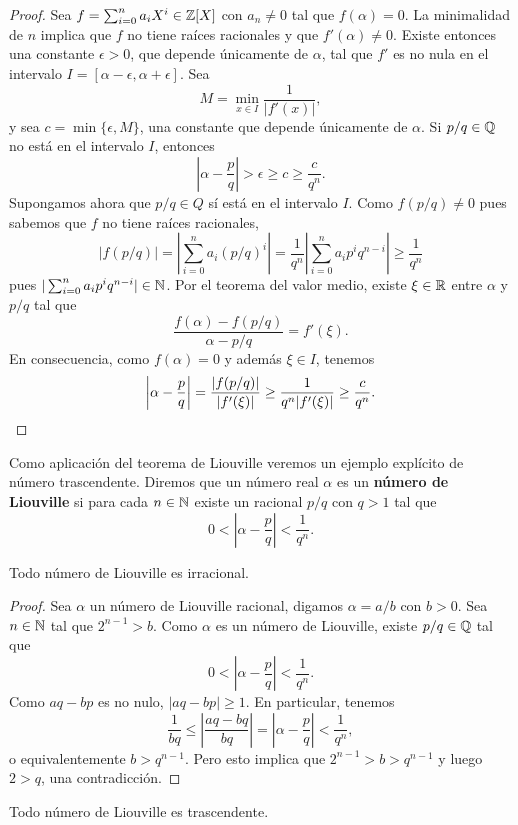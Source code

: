 \begin{proof}
	Sea	$f=\sum_{i=0}^na_iX^i\in\mathbb{Z}[X]$ con $a_n\ne0$ tal que $f(\alpha)=0$.  
	La minimalidad
	de $n$ implica que $f$ no tiene raíces racionales y que $f'(\alpha)\ne 0$.
	Existe entonces una constante $\epsilon>0$, que depende únicamente de
	$\alpha$,  tal que $f'$ es no nula en el intervalo
	$I=[\alpha-\epsilon,\alpha+\epsilon]$.  Sea 
	\[
		M=\min_{x\in I}\frac{1}{|f'(x)|},
	\]
	y sea $c=\min\{\epsilon,M\}$, una constante que depende únicamente de $\alpha$. 
	Si $p/q\in\mathbb{Q}$ no está en el intervalo $I$, entonces 
	\[
		\left|\alpha-\frac{p}{q}\right|>\epsilon\geq c\geq\frac{c}{q^n}.
	\]
	Supongamos ahora que $p/q\in Q$ sí está en el intervalo $I$. Como 
	$f(p/q)\ne 0$ pues sabemos que $f$ no tiene raíces racionales, 
	\[
		|f(p/q)|=\left|\sum_{i=0}^na_i(p/q)^i\right|
		=\frac{1}{q^n}\left|\sum_{i=0}^na_ip^iq^{n-i}\right|\geq\frac{1}{q^n}
	\]
	pues $|\sum_{i=0}^na_ip^iq^{n-i}|\in\mathbb{N}$. Por el teorema del valor medio, existe
	$\xi\in\mathbb{R}$ entre $\alpha$ y $p/q$ tal que 
	\[
		\frac{f(\alpha)-f(p/q)}{\alpha-p/q}=f'(\xi).
	\]
	En consecuencia, como $f(\alpha)=0$ y además $\xi\in I$, tenemos  
	\[
		\left|\alpha-\frac{p}{q}\right|
		=\frac{|f(p/q)|}{|f'(\xi)|}\geq\frac{1}{q^n|f'(\xi)|}\geq\frac{c}{q^n}.\qedhere
	\]
\end{proof}

Como aplicación del teorema de Liouville veremos un ejemplo explícito de número
trascendente.  Diremos que un número real $\alpha$ es un \textbf{número de
Liouville} si para cada $n\in\mathbb{N}$ existe un racional $p/q$ con $q>1$ tal que 
\[
	0<\left|\alpha-\frac{p}{q}\right|<\frac{1}{q^n}.
\]

\begin{proposition}
	Todo número de Liouville es irracional.	
\end{proposition}

\begin{proof}
	Sea $\alpha$ un número de Liouville racional, digamos $\alpha=a/b$ con
	$b>0$. Sea $n\in\mathbb{N}$ tal que $2^{n-1}>b$. Como $\alpha$ es un número de
	Liouville, existe $p/q\in\mathbb{Q}$ tal que
	\[
		0<\left|\alpha-\frac{p}{q}\right|<\frac{1}{q^n}.
	\]
	Como $aq-bp$ es no nulo, $|aq-bp|\geq 1$. En particular, tenemos 
	\[
		\frac{1}{bq}\leq \left|\frac{aq-bq}{bq}\right|=\left|\alpha-\frac{p}{q}\right|<\frac{1}{q^n},
	\]
	o equivalentemente $b>q^{n-1}$. Pero esto implica que $2^{n-1}>b>q^{n-1}$ y
	luego $2>q$, una contradicción.
\end{proof}

\begin{proposition}
	Todo número de Liouville es trascendente.	
\end{proposition}

